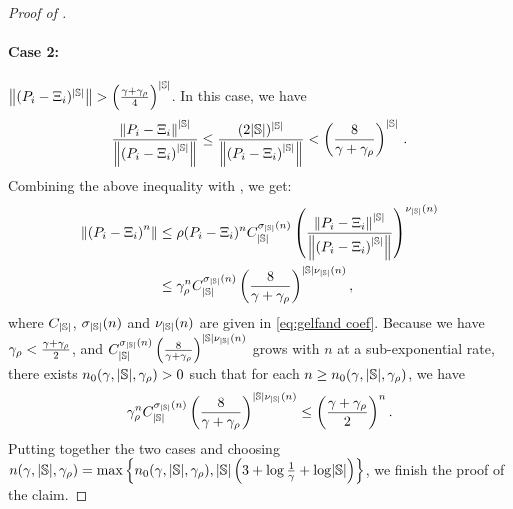 \begin{proof}[Proof of ]
    \paragraph{Case 2:} $\left\lVert(P_i-\Xi_i)^{\lvert\mathbb{S}\rvert}\right\rVert>\left(\frac{\gamma+\gamma_{\rho}}{4}\right)^{\lvert\mathbb{S}\rvert}$. In this case, we have
    \begin{align*}
        \frac{\left\lVert P_i-\Xi_i\right\rVert^{\lvert\mathbb{S}\rvert}}{\left\lVert\left(P_i-\Xi_i\right)^{\lvert\mathbb{S}\rvert}\right\rVert}\leq \frac{(2\lvert\mathbb{S}\rvert)^{\lvert\mathbb{S}\rvert}}{\left\lVert\left(P_i-\Xi_i\right)^{\lvert\mathbb{S}\rvert}\right\rVert} < \left(\frac{8}{\gamma + \gamma_{\rho}}\right)^{\lvert\mathbb{S}\rvert}\,.
    \end{align*}
    Combining the above inequality with , we get:
    \begin{align}
        \nonumber
        \left\lVert\left(P_i-\Xi_i\right)^n\right\rVert&\leq \rho(P_i-\Xi_i)^n C_{\lvert\mathbb{S}\rvert}^{\sigma_{\lvert\mathbb{S}\rvert}(n)}\left(\frac{\left\lVert P_i-\Xi_i\right\rVert^{\lvert\mathbb{S}\rvert}}{\left\lVert\left(P_i-\Xi_i\right)^{\lvert\mathbb{S}\rvert}\right\rVert}\right)^{\nu_{\lvert\mathbb{S}\rvert}(n)}\\
        \label{eq:pf-power-series:eq-1}
        &\leq \gamma_{\rho}^nC_{\lvert\mathbb{S}\rvert}^{\sigma_{\lvert\mathbb{S}\rvert}(n)}\left(\frac{8}{\gamma + \gamma_{\rho}}\right)^{\lvert\mathbb{S}\rvert\nu_{\lvert\mathbb{S}\rvert}(n)},  
    \end{align}
    where $C_{\lvert\mathbb{S}\rvert}$, $\sigma_{\lvert\mathbb{S}\rvert}(n)$ and $\nu_{\lvert\mathbb{S}\rvert}(n)$ are given in \eqref{eq:gelfand coef}. Because we have $\gamma_{\rho} < \frac{\gamma+\gamma_{\rho}}{2}$,  
    and $C_{\lvert\mathbb{S}\rvert}^{\sigma_{\lvert\mathbb{S}\rvert}(n)}\left(\frac{8}{\gamma + \gamma_{\rho}}\right)^{\lvert\mathbb{S}\rvert\nu_{\lvert\mathbb{S}\rvert}(n)}$ grows with $n$ at a sub-exponential rate, there exists $n_0(\gamma,\lvert\mathbb{S}\rvert,\gamma_{\rho}) > 0$ such that for each $n\geq n_0(\gamma,\lvert\mathbb{S}\rvert,\gamma_{\rho})$, we have
    \[
        \gamma_{\rho}^nC_{\lvert\mathbb{S}\rvert}^{\sigma_{\lvert\mathbb{S}\rvert}(n)}\left(\frac{8}{\gamma + \gamma_{\rho}}\right)^{\lvert\mathbb{S}\rvert\nu_{\lvert\mathbb{S}\rvert}(n)}\leq \left(\frac{\gamma+\gamma_{\rho}}{2}\right)^n.
    \]
    Putting together the two cases and choosing $n(\gamma,\lvert\mathbb{S}\rvert,\gamma_{\rho})=\max\left\{ n_0(\gamma,\lvert\mathbb{S}\rvert,\gamma_{\rho}),\lvert\mathbb{S}\rvert\left(3+\log \frac{1}{\gamma}+\log \lvert\mathbb{S}\rvert\right) \right\}$, we finish the proof of the claim. 
    

\end{proof}
